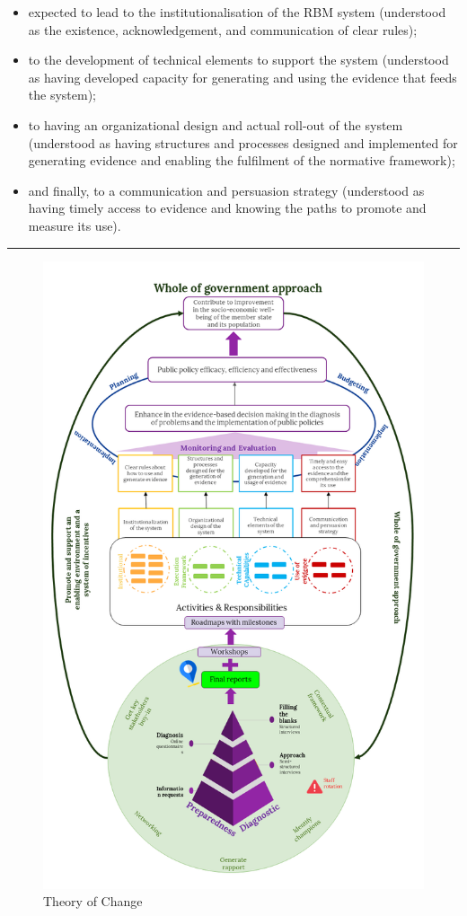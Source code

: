 \documentclass[
  10pt,
]{book}
\begin{document}
\begin{itemize}
\item
  expected to lead to the institutionalisation of the RBM system (understood as the existence, acknowledgement, and communication of clear rules);
\item
  to the development of technical elements to support the system (understood as having developed capacity for generating and using the evidence that feeds the system);
\item
  to having an organizational design and actual roll-out of the system (understood as having structures and processes designed and implemented for generating evidence and enabling the fulfilment of the normative framework);
\item
  and finally, to a communication and persuasion strategy (understood as having timely access to evidence and knowing the paths to promote and measure its use).
\end{itemize}

\begin{center}\rule{0.5\linewidth}{0.5pt}\end{center}

\begin{figure}

{\centering \includegraphics[width=0.75\linewidth]{./images/figure_1} 

}

\caption{Theory of Change}\label{fig:figure1}
\end{figure}
\end{document}
